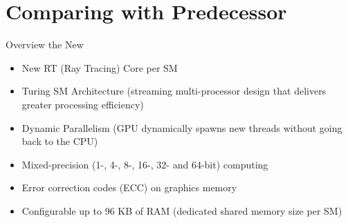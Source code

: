 \documentclass[xcolor=x11names,table]{beamer}
\begin{document}
\begin{frame}[allowframebreaks]
    \end{frame}


\section{Comparing with Predecessor}
    \begin{frame}{Overview the New}
        \begin{itemize}
            \item New RT (Ray Tracing) Core per SM
            \item Turing SM Architecture (streaming multi-processor design that delivers greater processing efficiency)
            \item Dynamic Parallelism (GPU dynamically spawns new threads without going back to the CPU)
            \item Mixed-precision (1-, 4-, 8-, 16-, 32- and 64-bit) computing
            \item Error correction codes (ECC) on graphics memory
            \item Configurable up to 96 KB of RAM (dedicated shared memory size per SM)
        \end{itemize}
    \end{frame}
    
\end{document}
